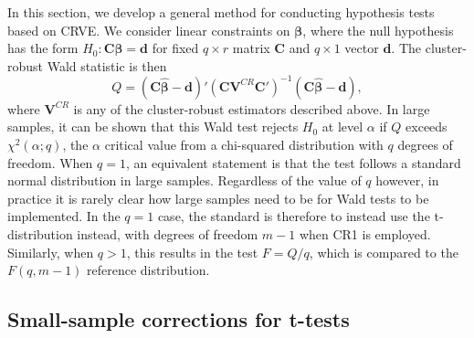 \documentclass[12pt]{article}\usepackage[]{graphicx}\usepackage[]{color}
\newcommand{\bm}{\mathbf}
\newcommand{\bs}{\boldsymbol}
\begin{document}
In this section, we develop a general method for conducting hypothesis tests based on CRVE. We consider linear constraints on $\bs\beta$, where the null hypothesis has the form $H_0: \bm{C}\bs\beta = \bm{d}$ for fixed $q \times r$ matrix $\bm{C}$ and $q \times 1$ vector $\bm{d}$. 
The cluster-robust Wald statistic is then
\begin{equation}
\label{eq:Wald_stat}
Q = \left(\bm{C}\bs{\hat\beta} - \bm{d}\right)'\left(\bm{C} \bm{V}^{CR} \bm{C}'\right)^{-1}\left(\bm{C}\bs{\hat\beta} - \bm{d}\right),
\end{equation}
where $\bm{V}^{CR}$ is any of the cluster-robust estimators described above.
In large samples, it can be shown that this Wald test rejects $H_0$ at level $\alpha$ if $Q$ exceeds $\chi^2(\alpha; q)$, the $\alpha$ critical value from a chi-squared distribution with $q$ degrees of freedom. 
When $q = 1$, an equivalent statement is that the test follows a standard normal distribution in large samples.
Regardless of the value of $q$ however, in practice it is rarely clear how large samples need to be for Wald tests to be implemented.
In the $q = 1$ case, the standard is therefore to instead use the t-distribution instead, with degrees of freedom $m - 1$ when CR1 is employed.
Similarly, when $q > 1$, this results in the test $F = Q/q$, which is compared to the $F(q, m - 1)$ reference distribution.


\subsection{Small-sample corrections for t-tests}
 
\end{document}
